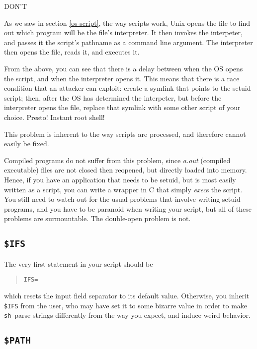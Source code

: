 \documentclass{article}
\newcommand{\cmd}[1]{\textit{#1}}
\newcommand{\code}[1]{\texttt{#1}}
\newcommand{\sh}{\code{sh}}
\begin{document}
\begin{center}
\Huge{DON'T}
\end{center}

	As we saw in section \ref{os-script}, the way scripts work,
Unix opens the file to find out which program will be the file's
interpreter. It then invokes the interpeter, and passes it the
script's pathname as a command line argument. The interpreter then
opens the file, reads it, and executes it.

	From the above, you can see that there is a delay between when
the OS opens the script, and when the interpreter opens it. This means
that there is a race condition that an attacker can exploit: create a
symlink that points to the setuid script; then, after the OS has
determined the interpeter, but before the interpreter opens the file,
replace that symlink with some other script of your choice. Presto!
Instant root shell!

	This problem is inherent to the way scripts are processed, and
therefore cannot easily be fixed.

	Compiled programs do not suffer from this problem, since
\cmd{a.out} (compiled executable) files are not closed then reopened,
but directly loaded into memory. Hence, if you have an application
that needs to be setuid, but is most easily written as a script, you
can write a wrapper in C that simply \cmd{exec}s the script. You still
need to watch out for the usual problems that involve writing setuid
programs, and you have to be paranoid when writing your script, but
all of these problems are surmountable. The double-open problem is
not.

\subsection{\code{\$IFS}}

	The very first statement in your script should be
\begin{quote}
\begin{verbatim}
IFS=
\end{verbatim}
\end{quote}
which resets the input field separator to its default
value. Otherwise, you inherit \code{\$IFS} from the user, who may have
set it to some bizarre value in order to make \sh\ parse strings
differently from the way you expect, and induce weird behavior.

\subsection{\code{\$PATH}}
\end{document}
